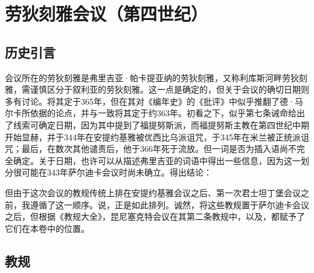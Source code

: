 
\chapter{劳狄刻雅会议（第四世纪）}



\section{历史引言}

会议所在的劳狄刻雅是弗里吉亚·帕卡提亚纳的劳狄刻雅，又称利库斯河畔劳狄刻雅，需谨慎区分于叙利亚的劳狄刻雅。这一点是确定的，但关于会议的确切日期则多有讨论。将其定于365年，但在其对《编年史》的《批评》中似乎推翻了德·马尔卡所依据的论点，并与一致将其定于约363年。初看之下，似乎第七条诫命给出了线索可确定日期，因为其中提到了福提努斯派，而福提努斯主教在第四世纪中期开始显赫，并于344年在安提约基雅被优西比乌派诅咒，于345年在米兰被正统派诅咒；最后，在数次其他谴责后，他于366年死于流放。但一词是否为插入语尚不完全确定。关于日期，也许可以从描述弗里吉亚的词语中得出一些信息，因为这一划分很可能在343年萨尔迪卡会议时尚未确立。得出结论：\par

但由于这次会议的教规传统上排在安提约基雅会议之后、第一次君士坦丁堡会议之前，我遵循了这一顺序。说，正是如此排列。诚然，将这些教规置于萨尔迪卡会议之后，但根据《教规大全》，昆尼塞克特会议在其第二条教规中，以及，都赋予了它们在本卷中的位置。\par


\section{教规}

